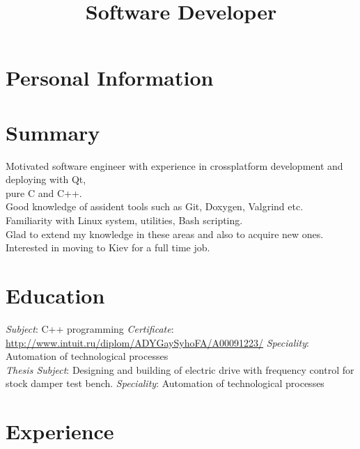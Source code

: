 \documentclass[11pt,a4paper]{moderncv}
\title{Software Developer}
\begin{document}
\maketitle

\section{Personal Information}

\section{Summary}
Motivated software engineer with experience in crossplatform development and deploying with Qt, \\pure C and C++.\\
Good knowledge of assident tools such as Git, Doxygen, Valgrind etc.\\
Familiarity with Linux system, utilities, Bash scripting.\\
Glad to extend my knowledge in these areas and also to acquire new ones.\\
Interested in moving to Kiev for a full time job.

\section{Education}
{\textit{Subject}: C++ programming
\newline \textit{Certificate}: {\color{web} \url{http://www.intuit.ru/diplom/ADYGaySyhoFA/A00091223/}}}
{\textit{Speciality}: Automation of technological processes\\
 \textit{Thesis Subject}: Designing and building of electric drive with frequency control for stock damper test bench.}
{\textit{Speciality}: Automation of technological processes}

\section{Experience}
\end{document}
